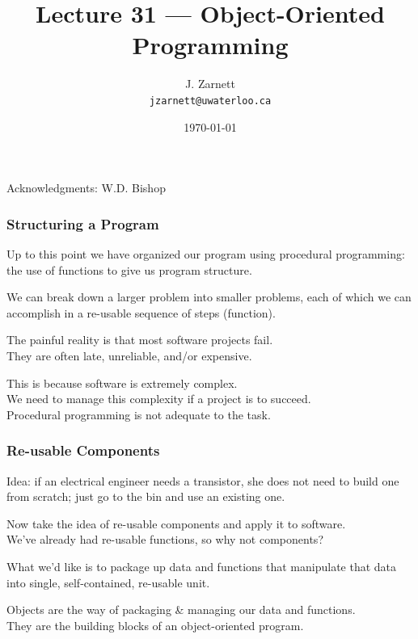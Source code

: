 

\title{Lecture 31 --- Object-Oriented Programming }

\author{J. Zarnett\\
\texttt{jzarnett@uwaterloo.ca}}
\date{\today}



\begin{frame}
  \titlepage
  
  \begin{center}
  \small{Acknowledgments: W.D. Bishop}
  \end{center}
\end{frame}



\begin{frame}
\frametitle{Structuring a Program}

Up to this point we have organized our program using procedural programming: the use of functions to give us program structure.

We can break down a larger problem into smaller problems, each of which we can accomplish in a re-usable sequence of steps (function).

The painful reality is that most software projects fail.\\
\quad They are often late, unreliable, and/or expensive.

This is because software is extremely complex.\\
\quad We need to manage this complexity if a project is to succeed.\\
\quad Procedural programming is not adequate to the task.

\end{frame}

\begin{frame}
\frametitle{Re-usable Components}

Idea: if an electrical engineer needs a transistor, she does not need to build one from scratch; just go to the bin and use an existing one.

Now take the idea of re-usable components and apply it to software.\\
\quad We've already had re-usable functions, so why not components?

What we'd like is to package up data and functions that manipulate that data into single, self-contained, re-usable unit.

\alert{Objects} are the way of packaging \& managing our data and functions.\\
\quad They are the building blocks of an object-oriented program.

\end{frame}

